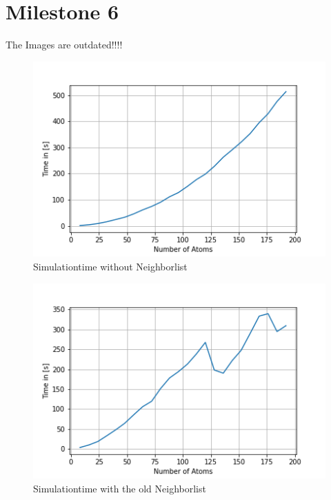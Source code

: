 \chapter{Milestone 6}

The Images are outdated!!!!
\begin{figure}[!h]
	\begin{center}
		\includegraphics[scale=1]{Figure/plotAtomTimes.png}
	\end{center}
	\caption[Simulationtime without Neighborlist]{Simulationtime without Neighborlist}
	\label{PlotAtomTimesSecond}
\end{figure}
\begin{figure}[!h]
	\begin{center}
		\includegraphics[scale=1]{Figure/plotAtomTimesTree.png}
	\end{center}
	\caption[Simulationtime with the old Neighborlist]{Simulationtime with the old Neighborlist}
	\label{PlotAtomTimesOldNeighbor}
\end{figure}

